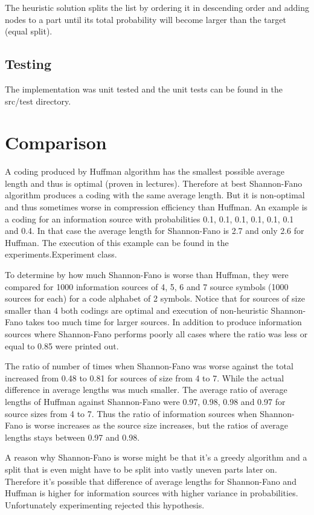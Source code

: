 \documentclass{article}
\begin{document}
The heuristic solution splits the list by ordering it in descending order and adding nodes to a part until its total probability will become larger than the target (equal split).

\subsection{Testing}

The implementation was unit tested and the unit tests can be found in the src/test directory.

\section{Comparison}

A coding produced by Huffman algorithm has the smallest possible average length and thus is optimal (proven in lectures). Therefore at best Shannon-Fano algorithm produces a coding with the same average length. But it is non-optimal and thus sometimes worse in compression efficiency than Huffman. An example is a coding for an information source with probabilities 0.1, 0.1, 0.1, 0.1, 0.1, 0.1 and 0.4. In that case the average length for Shannon-Fano is 2.7 and only 2.6 for Huffman. The execution of this example can be found in the experiments.Experiment class.

To determine by how much Shannon-Fano is worse than Huffman, they were compared for 1000 information sources of 4, 5, 6 and 7 source symbols (1000 sources for each) for a code alphabet of 2 symbols. Notice that for sources of size smaller than 4 both codings are optimal and execution of non-heuristic Shannon-Fano takes too much time for larger sources. In addition to produce information sources where Shannon-Fano performs poorly all cases where the ratio was less or equal to 0.85 were printed out.

The ratio of number of times when Shannon-Fano was worse against the total increased from 0.48 to 0.81 for sources of size from 4 to 7. While the actual difference in average lengths was much smaller. The average ratio of average lengths of Huffman against Shannon-Fano were 0.97, 0.98, 0.98 and 0.97 for source sizes from 4 to 7. Thus the ratio of information sources when Shannon-Fano is worse increases as the source size increases, but the ratios of average lengths stays between 0.97 and 0.98.

A reason why Shannon-Fano is worse might be that it's a greedy algorithm and a split that is even might have to be split into vastly uneven parts later on. Therefore it's possible that difference of average lengths for Shannon-Fano and Huffman is higher for information sources with higher variance in probabilities. Unfortunately experimenting rejected this hypothesis.
\end{document}
